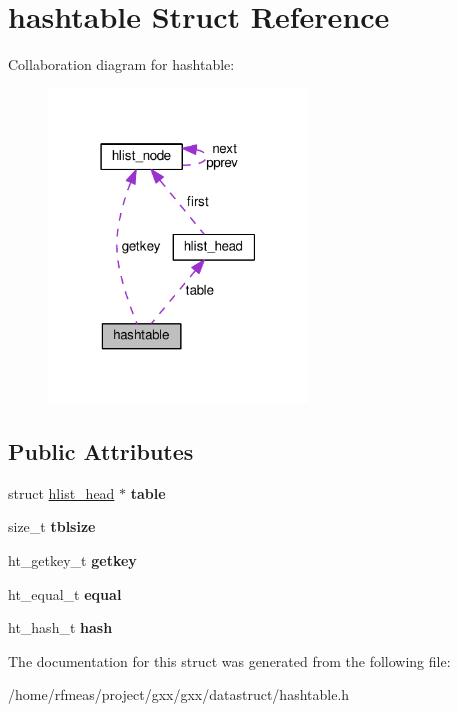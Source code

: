 \hypertarget{structhashtable}{}\section{hashtable Struct Reference}
\label{structhashtable}


Collaboration diagram for hashtable\+:
\nopagebreak
\begin{figure}[H]
\begin{center}
\leavevmode
\includegraphics[width=195pt]{structhashtable__coll__graph}
\end{center}
\end{figure}
\subsection*{Public Attributes}
\begin{DoxyCompactItemize}
\item 
struct \hyperlink{structhlist__head}{hlist\+\_\+head} $\ast$ {\bfseries table}\hypertarget{structhashtable_acae2f2c5864d12c48c531190aebe4645}{}\label{structhashtable_acae2f2c5864d12c48c531190aebe4645}

\item 
size\+\_\+t {\bfseries tblsize}\hypertarget{structhashtable_a0d77dfc93dff54482daaf4ce52a67e6e}{}\label{structhashtable_a0d77dfc93dff54482daaf4ce52a67e6e}

\item 
ht\+\_\+getkey\+\_\+t {\bfseries getkey}\hypertarget{structhashtable_ad4ec49f49c2cab4c6a49866d4db270b2}{}\label{structhashtable_ad4ec49f49c2cab4c6a49866d4db270b2}

\item 
ht\+\_\+equal\+\_\+t {\bfseries equal}\hypertarget{structhashtable_ad4ce92e4db39d31af41055480a111c7d}{}\label{structhashtable_ad4ce92e4db39d31af41055480a111c7d}

\item 
ht\+\_\+hash\+\_\+t {\bfseries hash}\hypertarget{structhashtable_ad53e7a6bc483df44b950340070c7c772}{}\label{structhashtable_ad53e7a6bc483df44b950340070c7c772}

\end{DoxyCompactItemize}


The documentation for this struct was generated from the following file\+:\begin{DoxyCompactItemize}
\item 
/home/rfmeas/project/gxx/gxx/datastruct/hashtable.\+h\end{DoxyCompactItemize}
